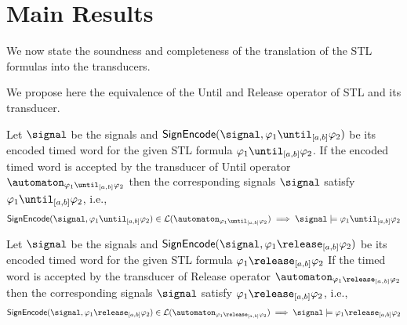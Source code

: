 \section{Main Results}
\label{sec:results}
We now state the soundness and completeness of the translation of the STL formulas into the transducers.

We propose here the equivalence of the Until and Release operator of STL and its transducer. %

\begin{proposition}    
\label{propo1}
        Let $\signal$ be the signals and $\textsf{SignEncode}(\signal,\varphi_1\until_{[a,b]}\varphi_2)$ be its encoded timed word for the given STL formula $\varphi_1\until_{[a,b]}\varphi_2$.
        If the encoded timed word is accepted by the transducer of Until operator $\automaton_{\varphi_1\until_{[a,b]}\varphi_2}$ then the corresponding signals  $\signal$  satisfy $ \varphi_1\until_{[a,b]}\varphi_2$, i.e.,
        \begin{align*}
            \textsf{SignEncode}(\signal,\varphi_1\until_{[a,b]}\varphi_2) \in \mathcal{L}(\automaton_{\varphi_1\until_{[a,b]}\varphi_2}) \implies \signal \models \varphi_1\until_{[a,b]}\varphi_2
        \end{align*}
\end{proposition}

\begin{proposition}   
\label{propo2}
    Let $\signal$ be the signals and $\textsf{SignEncode}(\signal,\varphi_1\release_{[a,b]}\varphi_2)$ be its encoded timed word for the given STL formula $\varphi_1\release_{[a,b]}\varphi_2$
    If the timed word is accepted by the transducer of Release operator $\automaton_{\varphi_1\release_{[a,b]}\varphi_2}$ then the corresponding  signals $\signal$ satisfy $ \varphi_1\release_{[a,b]}\varphi_2$, i.e.,
    \begin{align*}
        \textsf{SignEncode}(\signal,\varphi_1\release_{[a,b]}\varphi_2) \in \mathcal{L}(\automaton_{\varphi_1\release_{[a,b]}\varphi_2}) \implies \signal \models \varphi_1\release_{[a,b]}\varphi_2
    \end{align*}
\end{proposition}

